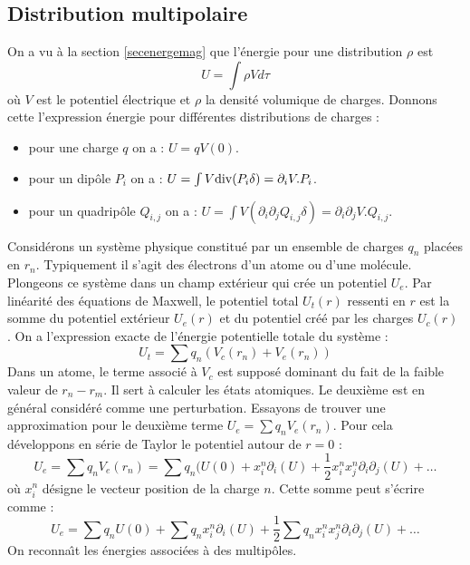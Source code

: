 \documentclass[12pt]{book}
\begin{document}
\subsection{Distribution multipolaire}
On a vu \`a la section \ref{secenergemag} que l'\'energie  pour une
distribution $\rho$ est 
\begin{equation}
U=\int \rho V d\tau
\end{equation}
o\`u $V$ est le potentiel \'electrique et $\rho$ la densit\'e volumique de
charges. 
Donnons cette l'expression \'energie pour diff\'erentes distributions
de charges : 
\begin{itemize}
\item pour une charge $q$ on a : $U=qV(0)$.
\item pour un dip\^ole $P_i$ on a : $U=\int V{\rm div}(P_i\delta)=\partial_i V.P_i$.
\item pour un quadrip\^ole $Q_{i,j}$ on a : $U=\int V(\partial_i\partial_jQ_{i,j}\delta)=\partial_i\partial_j V.Q_{i,j}$.
\end{itemize}
Consid\'erons un syst\`eme physique constitu\'e par un ensemble de
charges $q_n$ plac\'ees en $r_n$. Typiquement il s'agit des
\'electrons d'un atome ou d'une mol\'ecule. Plongeons ce syst\`eme dans un
champ 
ext\'erieur qui cr\'ee un potentiel $U_e$. Par lin\'earit\'e des
\'equations de Maxwell, le potentiel total $U_t(r)$ ressenti en $r$
est la somme du potentiel ext\'erieur $U_e(r)$ et du potentiel
cr\'e\'e par les charges $U_c(r)$ . On a l'expression exacte de
l'\'energie potentielle totale du syst\`eme : 
\begin{equation}
U_t=\sum q_n (V_c(r_n)+V_e(r_n))
\end{equation}
Dans un atome, le terme associ\'e \`a $V_c$ est suppos\'e
dominant du fait 
de la faible valeur de $r_n-r_m$. Il sert \`a calculer les \'etats
atomiques. Le deuxi\`eme est en g\'en\'eral consid\'er\'e comme une
perturbation. Essayons de trouver une approximation pour le deuxi\`eme
terme $U_e=\sum q_n V_e(r_n)$. Pour cela d\'eveloppons en s\'erie de
Taylor le potentiel autour de $r=0$ : 
\begin{equation}
U_e=\sum q_n V_e(r_n)=\sum q_n
(U(0) +x_i^n\partial_i(U)+
\frac{1}{2}x_i^nx_j^n\partial_i\partial_j(U)+\dots
\end{equation}
o\`u $x_i^n$ d\'esigne le vecteur position de la charge $n$. 
Cette somme peut s'\'ecrire comme :
\begin{equation}
U_e=\sum q_n U(0)+\sum q_nx_i^n\partial_i(U)+\frac{1}{2}\sum
q_nx_i^nx_j^n\partial_i\partial_j(U)+\dots 
\end{equation}
On reconna\^\i t les \'energies associ\'ees \`a des multip\^oles.
\end{document}
